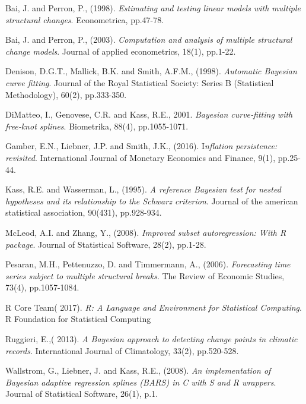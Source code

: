 \documentclass[submit]{smj}
\begin{document}
\begin{thebibliography}{99}
Bai, J. and Perron, P., (1998).
\textit{Estimating and testing linear models with multiple structural changes}.
Econometrica, pp.47-78.

Bai, J. and Perron, P., (2003).
\textit{ Computation and analysis of multiple structural change models}.
Journal of applied econometrics, 18(1), pp.1-22.

Denison, D.G.T., Mallick, B.K. and Smith, A.F.M., (1998). 
\textit{Automatic Bayesian curve fitting}. 
Journal of the Royal Statistical Society: Series B (Statistical Methodology), 60(2), pp.333-350.

DiMatteo, I., Genovese, C.R. and Kass, R.E., 2001. 
\textit{Bayesian curve‐fitting with free‐knot splines}. 
Biometrika, 88(4), pp.1055-1071.

Gamber, E.N., Liebner, J.P. and Smith, J.K., (2016). 
I\textit{nflation persistence: revisited}. 
International Journal of Monetary Economics and Finance, 9(1), pp.25-44.

Kass, R.E. and Wasserman, L., (1995). 
\textit{A reference Bayesian test for nested hypotheses and its relationship to the Schwarz criterion}. 
Journal of the american statistical association, 90(431), pp.928-934.

McLeod, A.I. and Zhang, Y., (2008).
\textit{ Improved subset autoregression: With R package}. 
 Journal of Statistical Software, 28(2), pp.1-28.

Pesaran, M.H., Pettenuzzo, D. and Timmermann, A., (2006). 
\textit{Forecasting time series subject to multiple structural breaks}. 
The Review of Economic Studies, 73(4), pp.1057-1084.

R Core Team( 2017). 
\textit{R: A Language and Environment for Statistical Computing}.
R Foundation for Statistical Computing

Ruggieri, E.,( 2013). 
\textit{A Bayesian approach to detecting change points in climatic records}.
International Journal of Climatology, 33(2), pp.520-528.

Wallstrom, G., Liebner, J. and Kass, R.E., (2008). 
\textit{An implementation of Bayesian adaptive regression splines (BARS) in C with S and R wrappers}. 
Journal of Statistical Software, 26(1), p.1.


\end{thebibliography}
\end{document}
